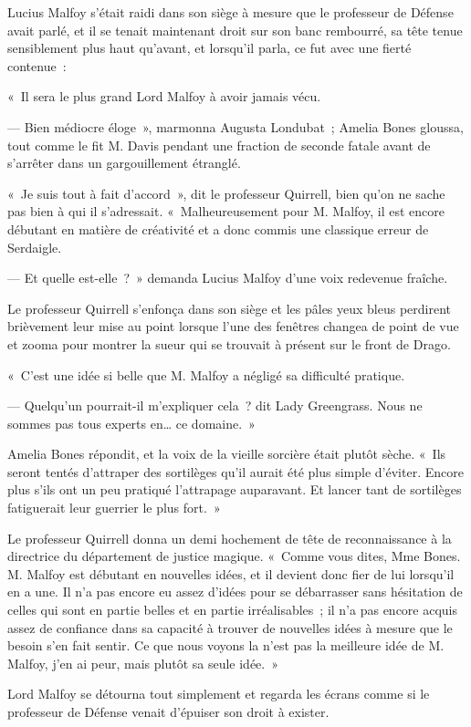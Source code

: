 Lucius Malfoy s'était raidi dans son siège à mesure que le professeur de Défense avait parlé, et il se tenait maintenant droit sur son banc rembourré, sa tête tenue sensiblement plus haut qu'avant, et lorsqu'il parla, ce fut avec une fierté contenue~:

«~Il sera le plus grand Lord Malfoy à avoir jamais vécu.

--- Bien médiocre éloge~», marmonna Augusta Londubat~; Amelia Bones gloussa, tout comme le fit M. Davis pendant une fraction de seconde fatale avant de s'arrêter dans un gargouillement étranglé.

«~Je suis tout à fait d'accord~», dit le professeur Quirrell, bien qu'on ne sache pas bien à qui il s'adressait. «~Malheureusement pour M. Malfoy, il est encore débutant en matière de créativité et a donc commis une classique erreur de Serdaigle.

--- Et quelle est-elle~?~» demanda Lucius Malfoy d'une voix redevenue fraîche.

Le professeur Quirrell s'enfonça dans son siège et les pâles yeux bleus perdirent brièvement leur mise au point lorsque l'une des fenêtres changea de point de vue et zooma pour montrer la sueur qui se trouvait à présent sur le front de Drago.

«~C'est une idée si belle que M. Malfoy a négligé sa difficulté pratique.

--- Quelqu'un pourrait-il m'expliquer cela~? dit Lady Greengrass. Nous ne sommes pas tous experts en… ce domaine.~»

Amelia Bones répondit, et la voix de la vieille sorcière était plutôt sèche. «~Ils seront tentés d'attraper des sortilèges qu'il aurait été plus simple d'éviter. Encore plus s'ils ont un peu pratiqué l'attrapage auparavant. Et lancer tant de sortilèges fatiguerait leur guerrier le plus fort.~»

Le professeur Quirrell donna un demi hochement de tête de reconnaissance à la directrice du département de justice magique. «~Comme vous dites, Mme Bones. M. Malfoy est débutant en nouvelles idées, et il devient donc fier de lui lorsqu'il en a une. Il n'a pas encore eu assez d'idées pour se débarrasser sans hésitation de celles qui sont en partie belles et en partie irréalisables~; il n'a pas encore acquis assez de confiance dans sa capacité à trouver de nouvelles idées à mesure que le besoin s'en fait sentir. Ce que nous voyons la n'est pas la meilleure idée de M. Malfoy, j'en ai peur, mais plutôt sa seule idée.~»

Lord Malfoy se détourna tout simplement et regarda les écrans comme si le professeur de Défense venait d'épuiser son droit à exister.

